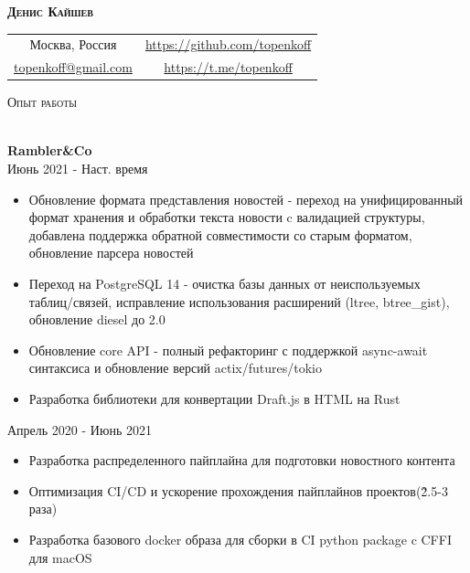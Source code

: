 \documentclass[a4paper]{article}
\newcommand{\lineunder} {
    \vspace*{-8pt} \\
    \hspace*{-18pt} \hrulefill \\
}
\newcommand{\header} [1] {
    {\hspace*{-18pt}\vspace*{6pt} \textsc{#1}}
    \vspace*{-6pt} \lineunder
}
\begin{document}
\vspace*{-40pt}

\vspace*{-10pt}
\begin{center}
    \textbf{{\huge \scshape {Денис Кайшев}}}\\
    \vspace*{10pt}
    \begin{tabular}{c c}
        Москва, Россия & \url{https://github.com/topenkoff} \\
        \href{mailto:topenkoff@gmail.com}{topenkoff@gmail.com} & \url{https://t.me/topenkoff} \\
    \end{tabular}
    \vspace*{15pt}
\end{center}

\header{Опыт работы}
\vspace{1mm}

\textbf{Rambler\&Co} \\
 \hfill Июнь 2021 - Наст. время\\
\vspace{-1mm}
\begin{itemize} \itemsep -1pt
	\item Обновление формата представления новостей - переход на унифицированный формат хранения и обработки текста новости c валидацией структуры, добавлена поддержка обратной совместимости со старым форматом, обновление парсера новостей
	\item Переход на PostgreSQL 14 - очистка базы данных от неиспользуемых таблиц/связей, исправление использования расширений (ltree, btree\_gist), обновление diesel до 2.0
	\item Обновление core API - полный рефакторинг с поддержкой async-await синтаксиса и обновление версий actix/futures/tokio
	\item Разработка библиотеки для конвертации Draft.js в HTML на Rust
\end{itemize}
 \hfill Апрель 2020 - Июнь 2021\\
\begin{itemize} \itemsep -1pt
    \item Разработка распределенного пайплайна для подготовки новостного контента
    \item Оптимизация CI/CD и ускорение прохождения пайплайнов проектов(\~2.5-3 раза)
    \item Разработка базового docker образа для сборки в CI python package c CFFI для macOS
\end{itemize}
\end{document}
